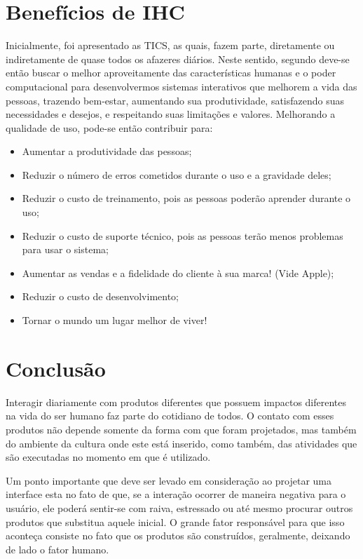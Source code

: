 \section{Benefícios de IHC}

Inicialmente, foi apresentado as TICS, as quais, fazem parte, diretamente ou indiretamente de quase todos os afazeres diários. Neste sentido, segundo  deve-se então buscar o melhor aproveitamente das características humanas e o poder computacional para desenvolvermos sistemas interativos que melhorem a vida das pessoas, trazendo bem-estar, aumentando sua produtividade, satisfazendo suas necessidades e desejos, e respeitando suas limitações e valores. Melhorando a qualidade de uso, pode-se então contribuir para:


\begin{itemize}
    \item Aumentar a produtividade das pessoas;
    \item Reduzir o número de erros cometidos durante o uso e a gravidade deles;
    \item Reduzir o custo de treinamento, pois as pessoas poderão aprender durante o uso;
    \item Reduzir o custo de suporte técnico, pois as pessoas terão menos problemas para usar o sistema;
    \item Aumentar as vendas e a fidelidade do cliente à sua marca! (Vide Apple);
    \item Reduzir o custo de desenvolvimento;
    \item Tornar o mundo um lugar melhor de viver!
\end{itemize}

\section{Conclusão}
Interagir diariamente com produtos diferentes que possuem impactos diferentes na vida do ser humano faz parte do cotidiano de todos. O contato com esses produtos não depende somente da forma com que foram projetados, mas também do ambiente da cultura onde este está inserido, como também, das atividades que são executadas no momento em que é utilizado. 

Um ponto importante que deve ser levado em consideração ao projetar uma interface esta no fato de que, se a interação ocorrer de maneira negativa para o usuário, ele poderá sentir-se com raiva, estressado ou até mesmo procurar outros produtos que substitua aquele inicial. O grande fator responsável para que isso aconteça consiste no fato que os produtos são construídos, geralmente, deixando de lado o fator humano.

